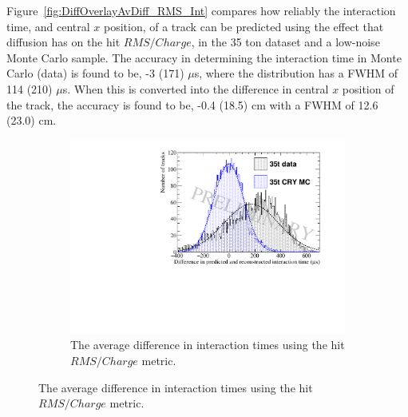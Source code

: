 Figure~\ref{fig:DiffOverlayAvDiff_RMS_Int} compares how reliably the interaction time, and central $x$ position, of a track can be predicted using the effect that diffusion has on the hit $RMS/Charge$, in the 35 ton dataset and a low-noise Monte Carlo sample. The accuracy in determining the interaction time in Monte Carlo (data) is found to be, -3 (171) $\mu$s, where the distribution has a FWHM of 114 (210) $\mu$s. When this is converted into the difference in central $x$ position of the track, the accuracy is found to be, -0.4 (18.5) cm with a FWHM of 12.6 (23.0) cm. \\

\begin{figure}
  \centering
  \begin{subfigure}{0.6\textwidth}
    \centering
    \includegraphics[width=\textwidth]{Overlay_AvTimeDiff_RMS_Int}
    \caption{The average difference in interaction times using the hit $RMS/Charge$ metric.}
    \label{fig:DiffOverlayAvDiff_RMS_Int_T}
  \end{subfigure}


\end{figure}
